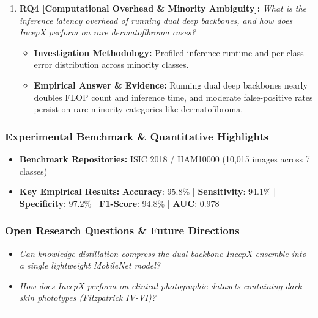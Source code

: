\begin{enumerate}[label=\textbf{\arabic*.}, leftmargin=*]
\begin{itemize}[leftmargin=1.5em]
  \end{itemize}
  \item \textbf{RQ4 [Computational Overhead \& Minority Ambiguity]:} \textit{What is the inference latency overhead of running dual deep backbones, and how does IncepX perform on rare dermatofibroma cases?}
  \begin{itemize}[leftmargin=1.5em]
    \item \textbf{Investigation Methodology:} Profiled inference runtime and per-class error distribution across minority classes.
    \item \textbf{Empirical Answer \& Evidence:} Running dual deep backbones nearly doubles FLOP count and inference time, and moderate false-positive rates persist on rare minority categories like dermatofibroma.
  \end{itemize}
\end{enumerate}

\subsubsection*{Experimental Benchmark \& Quantitative Highlights}
\begin{itemize}[leftmargin=*]
  \item \textbf{Benchmark Repositories:} ISIC 2018 / HAM10000 (10,015 images across 7 classes)
  \item \textbf{Key Empirical Results:} \textbf{Accuracy}: 95.8\% \quad | \quad \textbf{Sensitivity}: 94.1\% \quad | \quad \textbf{Specificity}: 97.2\% \quad | \quad \textbf{F1-Score}: 94.8\% \quad | \quad \textbf{AUC}: 0.978
\end{itemize}

\subsubsection*{Open Research Questions \& Future Directions}
\begin{itemize}[leftmargin=*]
  \item \textit{Can knowledge distillation compress the dual-backbone IncepX ensemble into a single lightweight MobileNet model?}
  \item \textit{How does IncepX perform on clinical photographic datasets containing dark skin phototypes (Fitzpatrick IV-VI)?}
\end{itemize}
\vspace{0.8em}\hrule\vspace{1.2em}
